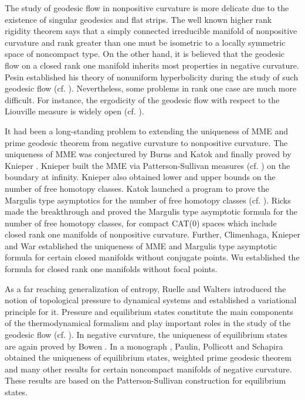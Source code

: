 \documentclass[11pt]{amsart}
\theoremstyle{definition}
\begin{document}
The study of geodesic flow in nonpositive curvature is more delicate due to the existence of singular geodesics and flat strips.  The well known higher rank rigidity theorem \cite{Bal, BS1, BS2} says that a simply connected irreducible manifold of nonpositive curvature and rank greater than one must be isometric to a locally symmetric space of noncompact type. On the other hand, it is believed that the geodesic flow on a closed rank one manifold inherits most properties in negative curvature. Pesin established his theory of nonuniform hyperbolicity during the study of such geodesic flow  (cf. \cite{BP}).  Nevertheless, some problems in rank one case are much more difficult. For instance, the ergodicity of the geodesic flow with respect to the Liouville measure is widely open (cf. \cite{BP, Wu,WLW}).

It had been a long-standing problem to extending the uniqueness of MME and prime geodesic theorem from negative curvature to nonpositive curvature. The uniqueness of MME was conjectured by Burns and Katok \cite{BuKa} and finally proved by Knieper \cite{Kn}. Knieper \cite{Kn} built the MME via Patterson-Sullivan measures (cf. \cite{Pat, Sul}) on the boundary at infinity. Knieper \cite{Kn1} also obtained lower and upper bounds on the number of free homotopy classes. Katok launched a program to prove the Margulis type asymptotics for the number of free homotopy classes (cf. \cite{We}). Ricks \cite{Ri} made the breakthrough and proved the Margulis type asymptotic formula for the number of free homotopy classes, for compact CAT(0) spaces which include closed rank one manifolds of nonpositive curvature. Further, Climenhaga, Knieper and War \cite{CKW1, CKW2} established the uniqueness of MME and Margulis type asymptotic formula for certain closed manifolds without conjugate points. Wu \cite{Wu2} established the formula for closed rank one manifolds without focal points.

As a far reaching generalization of entropy, Ruelle \cite{Ru} and Walters \cite{Wa} introduced the notion of topological pressure to dynamical systems and established a variational principle for it. Pressure and equilibrium states constitute the main components of the thermodynamical formalism and play important roles in the study of the geodesic flow (cf. \cite{PP1}). In negative curvature, the uniqueness of equilibrium states are again proved by Bowen \cite{Bo3,Bo4}. In a monograph \cite{PPS}, Paulin, Pollicott and Schapira obtained the uniqueness of equilibrium states, weighted prime geodesic theorem and many other results for certain noncompact manifolds of negative curvature. These results are based on the Patterson-Sullivan construction for equilibrium states.
\end{document}
